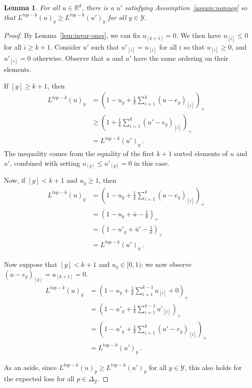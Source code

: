 \documentclass[12pt]{article}
\newcommand{\Comments}{1}
\newcommand{\mynote}[2]{\ifnum\Comments=1\textcolor{#1}{#2}\fi}
\newcommand{\raf}[1]{\mynote{green}{[RF: #1]}}
\newcommand{\reals}{\mathbb{R}}
\newcommand{\simplex}{\Delta_\Y}
\newcommand{\Y}{\mathcal{Y}}
\newtheorem{lemma}{Lemma}
\begin{document}
\begin{lemma}\label{lem:extra-elts-zero}
	For all $u \in \reals^d$, there is a $u'$ satisfying Assumption~\ref{assum:nonneg} so that $L^{top-k}(u)_y \geq L^{top-k}(u')_y$ for all $y \in \Y$.
\end{lemma}
\begin{proof}
	By Lemma~\ref{lem:invar-ones}, we can fix $u_{[k+1]} = 0$.
	We then have $u_{[i]} \leq 0$ for all $i \geq k+1$.
	Consider $u'$ such that $u'_{[i]} = u_{[i]}$ for all $i$ so that $u_{[i]} \geq 0$, and $u'_{[i]} = 0$ otherwise.
	Observe that $u$ and $u'$ have the same ordering on their elements.
	
	If $[y] \geq k+1$, then 
	\begin{align*}
	L^{top-k}(u)_y &= \left(1 - u_y + \frac 1 k \sum_{i=1}^k (u - e_y)_{[i]}\right)_+ \\
	&\geq \left(1 + \frac {1}{k} \sum_{i=1}^k (u' - e_y)_{[i]}\right)_+\\
	&= L^{top-k}(u')_y~.~
	\end{align*}
	The inequality comes from the equality of the first $k+1$ sorted elements of $u$ and $u'$, combined with setting $u_{[y]} \leq u'_{[y]} = 0$ in this case.
	
	Now, if $[y] < k+1$ and $u_y \geq 1$, then 
	\begin{align*}
	L^{top-k}(u)_y &= \left(1 - u_y + \frac 1 k \sum_{i=1}^k (u - e_y)_{[i]}\right)_+ \\
	&= \left(1 - u_y + \bar u - \frac 1 k\right)_+\\
	&= \left(1 - u'_y + \bar u' - \frac 1 k\right)_+\\
	&= L^{top-k}(u')_y~.~
	\end{align*}
	
	Now suppose that $[y] < k+1$ and $u_y \in [0,1)$; we now observe $(u - e_y)_{[k]} = u_{[k+1]} = 0$. 
	\begin{align*}
	L^{top-k}(u)_y &= \left(1 - u_y + \frac 1 k \sum_{i=1}^{k-1} u_{[i]} + 0 \right)_+\\
	&= \left(1 - u'_y + \frac 1 k \sum_{i=1}^{k-1} u'_{[i]}\right)_+\\
	&= \left(1 - u'_y + \frac 1 k \sum_{i=1}^{k} (u' - e_y)_{[i]}\right)_+\\
	&= L^{top-k}(u')_y~.~
	\end{align*}

	As an aside, since $L^{top-k}(u)_y \geq L^{top-k}(u')_y$ for all $y \in \Y$, this also holds for the expected loss for all $p \in \simplex$.
\end{proof}
\end{document}
